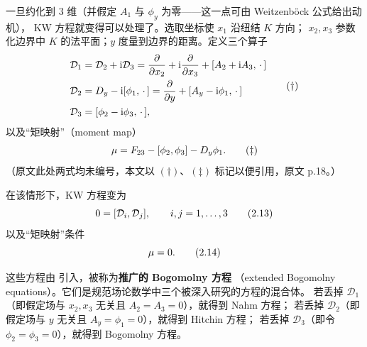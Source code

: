 一旦约化到 3 维（并假定 $A_1$ 与 $\phi_y$ 为零——这一点可由 Weitzenböck 公式给出动机），
KW 方程就变得可以处理了。选取坐标使 $x_1$ 沿纽结 $K$ 方向；
$x_2,x_3$ 参数化边界中 $K$ 的法平面；$y$ 度量到边界的距离。定义三个算子
\begin{equation}\stepcounter{equation}
\begin{aligned}
  \mathcal{D}_1&=\mathcal{D}_2+\mathrm{i}\mathcal{D}_3
    =\frac{\partial}{\partial x_2}+\mathrm{i}\frac{\partial}{\partial x_3}
     +[A_2+\mathrm{i}A_3,\,\cdot\,]\\
  \mathcal{D}_2&=D_y-\mathrm{i}[\phi_1,\,\cdot\,]
    =\frac{\partial}{\partial y}+[A_y-\mathrm{i}\phi_1,\,\cdot\,]\\
  \mathcal{D}_3&=[\phi_2-\mathrm{i}\phi_3,\,\cdot\,],
\end{aligned}
\tag{$\dagger$}\label{eq:Dops}
\end{equation}
以及“矩映射”（moment map）
\begin{equation}\stepcounter{equation}
  \mu=F_{23}-[\phi_2,\phi_3]-D_y\phi_1 .
  \tag{$\ddagger$}\label{eq:mu}
\end{equation}
（原文此处两式均未编号，本文以 $(\dagger)$、$(\ddagger)$ 标记以便引用，原文 p.18。）


在该情形下，KW 方程变为
\begin{equation}\stepcounter{equation}
  0=[\mathcal{D}_i,\mathcal{D}_j],\qquad i,j=1,\dots,3
  \tag{2.13}\label{eq:2.13}
\end{equation}
以及“矩映射”条件
\begin{equation}\stepcounter{equation}
  \mu=0 .
  \tag{2.14}\label{eq:2.14}
\end{equation}

这些方程由 \cite{KW} 引入，被称为\textbf{推广的 Bogomolny 方程}
（extended Bogomolny equations）。它们是规范场论数学中三个被深入研究的方程的混合体。
若丢掉 $\mathcal{D}_1$（即假定场与 $x_2,x_3$ 无关且 $A_2=A_3=0$），就得到 Nahm 方程；
若丢掉 $\mathcal{D}_2$（即假定场与 $y$ 无关且 $A_y=\phi_1=0$），就得到 Hitchin 方程；
若丢掉 $\mathcal{D}_3$（即令 $\phi_2=\phi_3=0$），就得到 Bogomolny 方程。

